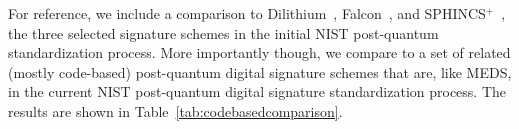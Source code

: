 \documentclass[11pt,a4paper]{report}
\theoremstyle{definition}
\begin{document}
For reference, we include a comparison to Dilithium~\cite{ducas2018crystals}, Falcon~\cite{fouque2018falcon}, and SPHINCS$^+$~\cite{aumasson2022sphincs}, the three selected signature schemes in the initial NIST post-quantum standardization process. More importantly though, we compare to a set of related (mostly code-based) post-quantum digital signature schemes that are, like MEDS, in the current NIST post-quantum digital signature standardization process. The results are shown in Table~\ref{tab:codebasedcomparison}.

\end{document}
